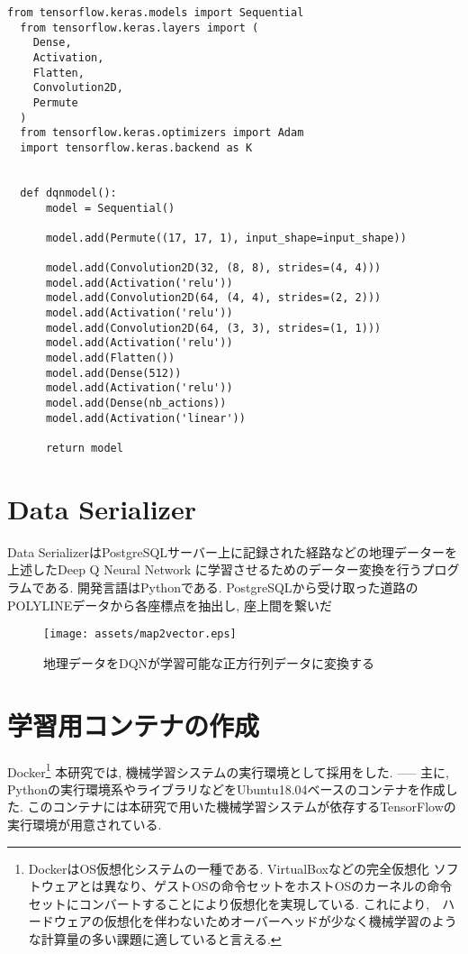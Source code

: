 \begin{lstlisting}[caption = DQNの深層学習部分を形成するモデル, label = program1]
  from tensorflow.keras.models import Sequential
  from tensorflow.keras.layers import (
    Dense,
    Activation,
    Flatten,
    Convolution2D,
    Permute
  )
  from tensorflow.keras.optimizers import Adam
  import tensorflow.keras.backend as K
  
  
  def dqnmodel():
      model = Sequential()
  
      model.add(Permute((17, 17, 1), input_shape=input_shape))
  
      model.add(Convolution2D(32, (8, 8), strides=(4, 4)))
      model.add(Activation('relu'))
      model.add(Convolution2D(64, (4, 4), strides=(2, 2)))
      model.add(Activation('relu'))
      model.add(Convolution2D(64, (3, 3), strides=(1, 1)))
      model.add(Activation('relu'))
      model.add(Flatten())
      model.add(Dense(512))
      model.add(Activation('relu'))
      model.add(Dense(nb_actions))
      model.add(Activation('linear'))
  
      return model  
\end{lstlisting}
  
  

\section{Data Serializer}

Data SerializerはPostgreSQLサーバー上に記録された経路などの地理データーを上述したDeep Q Neural Network
に学習させるためのデーター変換を行うプログラムである.
開発言語はPythonである. PostgreSQLから受け取った道路のPOLYLINEデータから各座標点を抽出し, 座上間を繋いだ



\begin{figure}[H]
  \centering  %
  \texttt{[image: assets/map2vector.eps]}
  \caption{地理データをDQNが学習可能な正方行列データに変換する}  \label{map2vector}
\end{figure}



\section{学習用コンテナの作成}

Docker\footnote{DockerはOS仮想化システムの一種である. VirtualBoxなどの完全仮想化
ソフトウェアとは異なり、ゲストOSの命令セットをホストOSのカーネルの命令セットにコンバートすることにより仮想化を実現している.
これにより,　ハードウェアの仮想化を伴わないためオーバーヘッドが少なく機械学習のような計算量の多い課題に適していると言える.}
本研究では, 機械学習システムの実行環境として採用をした.
-----
主に, Pythonの実行環境系やライブラリなどをUbuntu18.04ベースのコンテナを作成した.
このコンテナには本研究で用いた機械学習システムが依存するTensorFlowの実行環境が用意されている.

